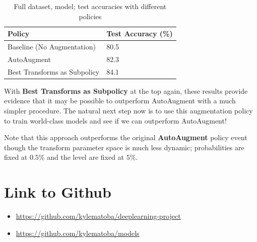 \documentclass[10pt,twocolumn,letterpaper]{article}
\begin{document}
\begin{table}[h]
    \begin{tabular}{l|l}
        \hline
        Policy                          &Test Accuracy (\%)   \\ \hline
        Baseline (No Augmentation)      &80.5 \\
        AutoAugment                     &82.3 \\
        Best Transforms as Subpolicy    &84.1 \\
    \end{tabular}
    \caption{Full dataset, model; test accuracies with different policies}
\end{table}

With \textbf{Best Transforms as Subpolicy} at the top again, these results provide evidence that it may be possible to outperform AutoAugment with a much simpler procedure. The natural next step now is to use this augmentation policy to train world-class models and see if we can outperform AutoAugment!


Note that this approach outperforms the original \textbf{AutoAugment} policy event though the transform parameter space is much less dynamic; probabilities are fixed at $0.5\%$ and the level are fixed at $5\%$.

\section{Link to Github}

	\begin{itemize}
	\item \url{https://github.com/kylematoba/deeplearning-project}
	\item \url{https://github.com/kylematoba/models}
	\end{itemize}


\nocite{Torralba2008}
{\small


}
\end{document}
